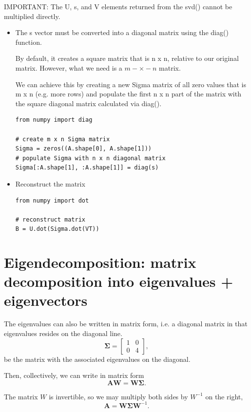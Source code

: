 IMPORTANT: The U, s, and V elements returned from the svd() cannot be multiplied directly.
\begin{itemize}
  \item  The s vector must be converted into a diagonal matrix using the diag() function.
  
  By default, it creates a square matrix that is n x n, relative to our original matrix.
  However, what we need is a $m-\times-n$ matrix. 
  
  We can achieve this by creating a new Sigma matrix of all zero values that is
  m x n (e.g. more rows) and populate the first n x n part of the matrix with
  the square diagonal matrix calculated via diag().
\begin{lstlisting}
from numpy import diag

# create m x n Sigma matrix
Sigma = zeros((A.shape[0], A.shape[1]))
# populate Sigma with n x n diagonal matrix
Sigma[:A.shape[1], :A.shape[1]] = diag(s)
\end{lstlisting}
  
  \item Reconstruct the matrix
\begin{verbatim}
from numpy import dot

# reconstruct matrix
B = U.dot(Sigma.dot(VT))
\end{verbatim}
\end{itemize}

\section{Eigendecomposition: matrix decomposition into eigenvalues + eigenvectors}
\label{sec:decomposition-matrix}

The eigenvalues can also be written in matrix form, i.e. a diagonal matrix in that eigenvalues resides on the diagonal line.
\begin{equation}
\boldsymbol{\Sigma} = \begin{bmatrix}
1 & 0 \\
0 & 4
\end{bmatrix},
\end{equation}
be the matrix with the associated eigenvalues on the diagonal.

Then, collectively, we can write in matrix form 
\begin{equation}
\mathbf{A}\mathbf{W} =\mathbf{W} \boldsymbol{\Sigma} .
\end{equation}


The matrix $W$ is invertible, so we may multiply both sides by $W^{-1}$ on the right,
\begin{equation}
\mathbf{A} = \mathbf{W} \boldsymbol{\Sigma} \mathbf{W}^{-1}.
\end{equation}

